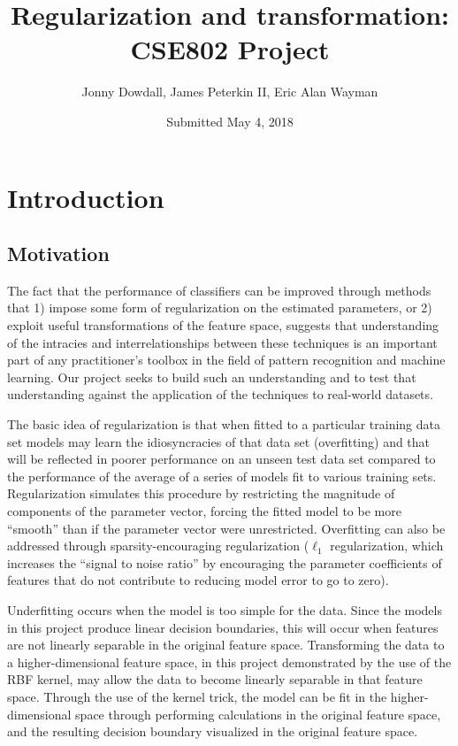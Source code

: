\documentclass[letterpaper, 11pt]{article}
\begin{document}
\renewcommand{\arraystretch}{1.1}

\title{Regularization and transformation:\\CSE802 Project}
\author{Jonny Dowdall, James Peterkin II, Eric Alan Wayman}
\date{Submitted May 4, 2018}
\maketitle

\section{Introduction}

\subsection{Motivation}

The fact that the performance of classifiers can be improved through methods that 1) impose some form of regularization on the estimated parameters, or 2) exploit useful transformations of the feature space, suggests that understanding of the intracies and interrelationships between these techniques is an important part of any practitioner's toolbox in the field of pattern recognition and machine learning. Our project seeks to build such an understanding and to test that understanding against the application of the techniques to real-world datasets.

The basic idea of regularization is that when fitted to a particular training data set models may learn the idiosyncracies of that data set (overfitting) and that will be reflected in poorer performance on an unseen test data set compared to the performance of the average of a series of models fit to various training sets. Regularization simulates this procedure by restricting the magnitude of components of the parameter vector, forcing the fitted model to be more ``smooth'' than if the parameter vector were unrestricted. Overfitting can also be addressed through sparsity-encouraging regularization ($\ell_1$ regularization, which increases the ``signal to noise ratio'' by encouraging the parameter coefficients of features that do not contribute to reducing model error to go to zero). 

Underfitting occurs when the model is too simple for the data. Since the models in this project produce linear decision boundaries, this will occur when features are not linearly separable in the original feature space. Transforming the data to a higher-dimensional feature space, in this project demonstrated by the use of the RBF kernel, may allow the data to become linearly separable in that feature space. Through the use of the kernel trick, the model can be fit in the higher-dimensional space through performing calculations in the original feature space, and the resulting decision boundary visualized in the original feature space.
\end{document}
